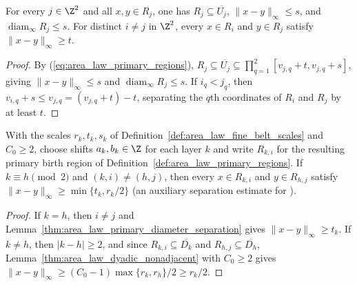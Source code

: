 \begin{lemma}
    \label{thm:area_law_primary_diameter_separation}
    \leanok
    For every $j\in\Z^2$ and all $x,y\in R_j$, one has
    $R_j\subseteq\overline{U_j}$, $\|x-y\|_\infty\le s$, and
    $\operatorname{diam}_\infty R_j\le s$. For distinct $i\ne j$ in $\Z^2$,
    every $x\in R_i$ and $y\in R_j$ satisfy $\|x-y\|_\infty\ge t$.
\end{lemma}
\begin{proof}\leanok
    By (\ref{eq:area_law_primary_regions}),
    $R_j\subseteq\overline{U_j}\subseteq\prod_{q=1}^2[v_{j,q}+t,v_{j,q}+s]$,
    giving $\|x-y\|_\infty\le s$ and $\operatorname{diam}_\infty R_j\le s$. If
    $i_q<j_q$, then $v_{i,q}+s\le v_{j,q}=(v_{j,q}+t)-t$, separating the $q$th
    coordinates of $R_i$ and $R_j$ by at least $t$.
\end{proof}

\begin{lemma}
    \label{thm:area_law_primary_same_parity_separation}
    \leanok
    With the scales $r_k,t_k,s_k$ of
    Definition~\ref{def:area_law_fine_belt_scales} and $C_0\ge2$, choose
    shifts $a_k,b_k\in\Z$ for each layer $k$ and write $R_{k,i}$ for the
    resulting primary birth region of
    Definition~\ref{def:area_law_primary_regions}. If $k\equiv h\pmod2$ and
    $(k,i)\ne(h,j)$, then every $x\in R_{k,i}$ and $y\in R_{h,j}$ satisfy
    $\|x-y\|_\infty\ge\min\{t_k,r_k/2\}$ (an auxiliary separation estimate for
    \cite[Section~11]{OpenAI2026AreaLaw}).
\end{lemma}
\begin{proof}
    \leanok
    If $k=h$, then $i\ne j$ and
    Lemma~\ref{thm:area_law_primary_diameter_separation} gives
    $\|x-y\|_\infty\ge t_k$. If $k\ne h$, then $|k-h|\ge2$, and since
    $R_{k,i}\subseteq\overline{D_k}$ and $R_{h,j}\subseteq\overline{D_h}$,
    Lemma~\ref{thm:area_law_dyadic_nonadjacent} with $C_0\ge2$ gives
    $\|x-y\|_\infty\ge(C_0-1)\max\{r_k,r_h\}/2\ge r_k/2$.
\end{proof}


